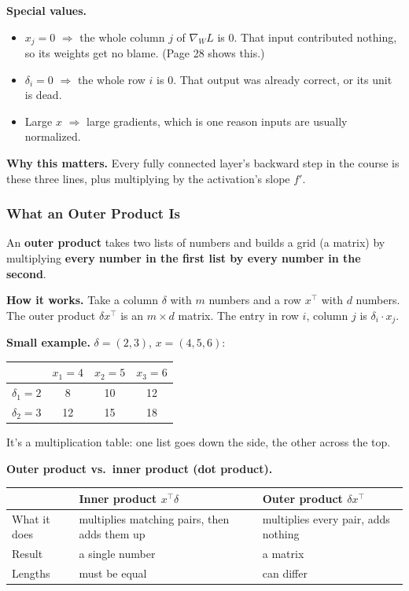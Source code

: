 \textbf{Special values.}
\begin{itemize}
  \item $x_j = 0$ $\Rightarrow$ the whole column $j$ of $\nabla_W L$ is 0. That input contributed nothing, so its weights get no blame. (Page 28 shows this.)
  \item $\delta_i = 0$ $\Rightarrow$ the whole row $i$ is 0. That output was already correct, or its unit is dead.
  \item Large $x$ $\Rightarrow$ large gradients, which is one reason inputs are usually normalized.
\end{itemize}

\textbf{Why this matters.} Every fully connected layer's backward step in the course is these three lines, plus multiplying by the activation's slope $f'$.

\subsubsection*{What an Outer Product Is}

An \textbf{outer product} takes two lists of numbers and builds a grid (a matrix) by multiplying \textbf{every number in the first list by every number in the second}.

\textbf{How it works.} Take a column $\delta$ with $m$ numbers and a row $x^\top$ with $d$ numbers. The outer product $\delta x^\top$ is an $m \times d$ matrix. The entry in row $i$, column $j$ is $\delta_i \cdot x_j$.

\textbf{Small example.} $\delta = (2, 3)$, $x = (4, 5, 6)$:

\begin{tabular}{cccc}
\toprule
 & $x_1 = 4$ & $x_2 = 5$ & $x_3 = 6$ \\
\midrule
$\delta_1 = 2$ & 8 & 10 & 12 \\
$\delta_2 = 3$ & 12 & 15 & 18 \\
\bottomrule
\end{tabular}

It's a multiplication table: one list goes down the side, the other across the top.

\textbf{Outer product vs.\ inner product (dot product).}

\begin{tabular}{lll}
\toprule
 & Inner product $x^\top \delta$ & Outer product $\delta x^\top$ \\
\midrule
What it does & multiplies matching pairs, then adds them up & multiplies every pair, adds nothing \\
Result & a single number & a matrix \\
Lengths & must be equal & can differ \\
\bottomrule
\end{tabular}

